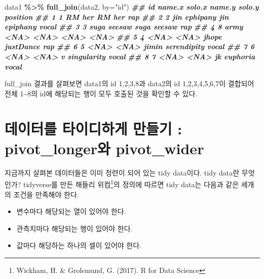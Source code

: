 \documentclass[
]{book}
\newenvironment{Shaded}{\begin{snugshade}}{\end{snugshade}}
\newcommand{\AttributeTok}[1]{\textcolor[rgb]{0.13,0.29,0.53}{#1}}
\newcommand{\DocumentationTok}[1]{\textcolor[rgb]{0.56,0.35,0.01}{\textbf{\textit{#1}}}}
\newcommand{\FunctionTok}[1]{\textcolor[rgb]{0.13,0.29,0.53}{\textbf{#1}}}
\newcommand{\NormalTok}[1]{#1}
\newcommand{\SpecialCharTok}[1]{\textcolor[rgb]{0.81,0.36,0.00}{\textbf{#1}}}
\newcommand{\StringTok}[1]{\textcolor[rgb]{0.31,0.60,0.02}{#1}}
\providecommand{\tightlist}{%
  \setlength{\itemsep}{0pt}\setlength{\parskip}{0pt}}
\begin{document}
\begin{Shaded}
\begin{Highlighting}[]
\NormalTok{data1 }\SpecialCharTok{\%\textgreater{}\%} 
  \FunctionTok{full\_join}\NormalTok{(data2, }\AttributeTok{by=}\StringTok{"id"}\NormalTok{)}
\DocumentationTok{\#\#   id name.x   solo.x name.y      solo.y position}
\DocumentationTok{\#\# 1  1     RM      her     RM         her      rap}
\DocumentationTok{\#\# 2  2    jin ephipany    jin    epiphany    vocal}
\DocumentationTok{\#\# 3  3   suga   seesaw   suga      seesaw      rap}
\DocumentationTok{\#\# 4  8   army     \textless{}NA\textgreater{}   \textless{}NA\textgreater{}        \textless{}NA\textgreater{}     \textless{}NA\textgreater{}}
\DocumentationTok{\#\# 5  4   \textless{}NA\textgreater{}     \textless{}NA\textgreater{}  jhope   justDance      rap}
\DocumentationTok{\#\# 6  5   \textless{}NA\textgreater{}     \textless{}NA\textgreater{}  jimin serendipity    vocal}
\DocumentationTok{\#\# 7  6   \textless{}NA\textgreater{}     \textless{}NA\textgreater{}      v singularity    vocal}
\DocumentationTok{\#\# 8  7   \textless{}NA\textgreater{}     \textless{}NA\textgreater{}     jk    euphoria    vocal}
\end{Highlighting}
\end{Shaded}

full\_join 결과를 살펴보면 data1의 id 1,2,3,8과 data2의 id 1,2,3,4,5,6,7이 결합되어 전체 1\textasciitilde8의 id에 해당되는 행이 모두 호출된 것을 확인할 수 있다.

\section{데이터를 타이디하게 만들기 : pivot\_longer와 pivot\_wider}\label{uxb370uxc774uxd130uxb97c-uxd0c0uxc774uxb514uxd558uxac8c-uxb9ccuxb4e4uxae30-pivot_longeruxc640-pivot_wider}

지금까지 살펴본 데이터들은 이미 정련이 되어 있는 tidy data이다. tidy data란 무엇인가? tidyverse를 만든 해들리 위컴\footnote{Wickham, H. \& Grolemund, G. (2017). R for Data Science}의 정의에 따르면 tidy data는 다음과 같은 세개의 조건을 만족해야 한다.

\begin{itemize}
\tightlist
\item
  변수마다 해당되는 열이 있어야 한다.
\item
  관측치마다 해당되는 행이 있어야 한다.
\item
  값마다 해당하는 하나의 셀이 있어야 한다.
\end{itemize}
\end{document}
